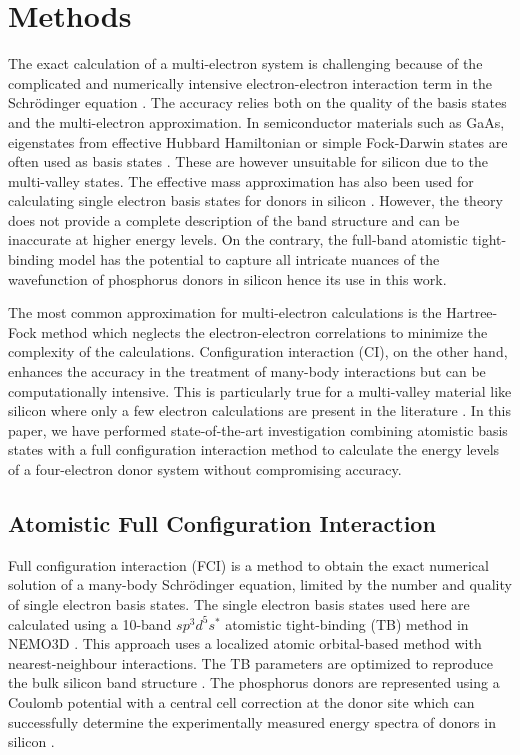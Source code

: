 \documentclass[%
showkeys,
 amsmath,amssymb,
 aps,
prb,
]{revtex4-2}
\begin{document}
\section{Methods}
The exact calculation of a multi-electron system is challenging because of the complicated and numerically intensive electron-electron interaction term in the Schr\"odinger equation \cite{szaboModernQuantumChemistry1996}. The accuracy relies both on the quality of the basis states and the multi-electron approximation. In semiconductor materials such as GaAs, eigenstates from effective Hubbard Hamiltonian \cite{chan_exchange_2021,malinowski_fast_2019,chan_sign_2022} or simple Fock-Darwin states are often used as basis states \cite{deng_interplay_2020}. These are however unsuitable for silicon due to the multi-valley states. The effective mass approximation has also been used for calculating single electron basis states for donors in silicon \cite{saraivaTheoryOneTwo2015,joeckerFullConfigurationInteraction2021}. However, the theory does not provide a complete description of the band structure and can be inaccurate at higher energy levels. On the contrary, the full-band atomistic tight-binding model has the potential to capture all intricate nuances of the wavefunction of phosphorus donors in silicon hence its use in this work. 

The most common approximation for multi-electron calculations is the Hartree-Fock method which neglects the electron-electron correlations to minimize the complexity of the calculations. Configuration interaction (CI), on the other hand, enhances the accuracy in the treatment of many-body interactions but can be computationally intensive. This is particularly true for a multi-valley material like silicon where only a few electron calculations are present in the literature \cite{tankasalaShallowDopantPairs2022b,tankasalaTwoelectronStatesGroupV2018}. In this paper, we have performed state-of-the-art investigation combining atomistic basis states with a full configuration interaction method to calculate the energy levels of a four-electron donor system without compromising accuracy. 

\subsection{Atomistic Full Configuration Interaction}
 Full configuration interaction (FCI) is a method to obtain the exact numerical solution of a many-body Schr\"odinger equation, limited by the number and quality of single electron basis states. The single electron basis states used here are calculated using a 10-band $sp^3d^5s^*$ atomistic tight-binding (TB) method in NEMO3D \cite{ahmedMultimillionAtomSimulations2009,klimeckAtomisticSimulationRealistically2007a}. This approach uses a localized atomic orbital-based method with nearest-neighbour interactions. The TB parameters are optimized to reproduce the bulk silicon band structure \cite{boykinValenceBandEffectivemass2004}. The phosphorus donors are represented using a Coulomb potential with a central cell correction at the donor site which can successfully determine the experimentally measured energy spectra of donors in silicon \cite{rahmanHighPrecisionQuantum2007,rahmanOrbitalStarkEffect2009}. 
 
\end{document}
